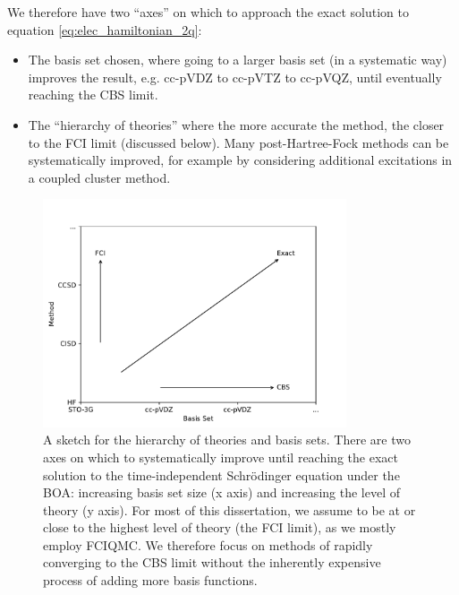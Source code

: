 We therefore have two ``axes'' on which to approach the exact solution to equation \ref{eq:elec_hamiltonian_2q}:
\begin{itemize}
    \item The basis set chosen, where going to a larger basis set (in a systematic way) improves the result, e.g. cc-pVDZ to cc-pVTZ to cc-pVQZ, until eventually reaching the \gls{CBS} limit.
    \item The ``hierarchy of theories'' where the more accurate the method, the closer to the \gls{FCI} limit (discussed below). Many post-Hartree-Fock methods can be systematically improved, for example by considering additional excitations in a coupled cluster method.
\end{itemize}

\begin{figure}[htbp]
    \centering
    \includegraphics[width=0.8\textwidth]{figures/intro/hierarchies.pdf}
    \caption{A sketch for the hierarchy of theories and basis sets. There are two axes on which to systematically improve until reaching the exact solution to the time-independent Schr\"odinger equation under the \gls{BOA}: increasing basis set size (x axis) and increasing the level of theory (y axis). For most of this dissertation, we assume to be at or close to the highest level of theory (the FCI limit), as we mostly employ \gls{FCIQMC}. We therefore focus on methods of rapidly converging to the \gls{CBS} limit without the inherently expensive process of adding more basis functions.}
    \label{fig:hierarchies}
\end{figure}



